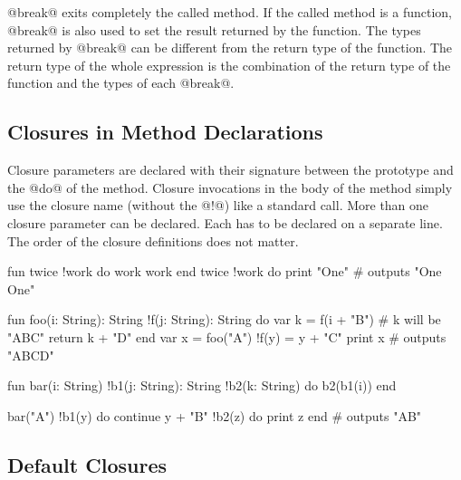 @break@ exits completely the called method.
If the called method is a function, @break@ is also used to set the result returned by the function.
The types returned by @break@ can be different from the return type of the function.
The return type of the whole expression is the combination of the return type of the function and the types of each @break@.

\subsection{Closures in Method Declarations}

Closure parameters are declared with their signature between the prototype and the @do@ of the method.
Closure invocations in the body of the method simply use the closure name (without the @!@) like a standard call.
More than one closure parameter can be declared.
Each has to be declared on a separate line.
The order of the closure definitions does not matter.

\begin{multicols}{2}
\begin{lst}
fun twice
	!work
do
	work
	work
end
twice !work do print "One"
# outputs "One One"
\end{lst}


\begin{lst}
fun foo(i: String): String
	!f(j: String): String
do
	var k = f(i + "B")
	# k will be "ABC"
	return k + "D"
end
var x = foo("A") !f(y) =
		y + "C"
print x # outputs "ABCD"
\end{lst}
\columnbreak
\begin{lst}
fun bar(i: String)
	!b1(j: String): String
	!b2(k: String)
do
	b2(b1(i))
end

bar("A") !b1(y) do
	continue y + "B"
!b2(z) do
	print z
end
# outputs "AB"
\end{lst}
\end{multicols}

\subsection{Default Closures}

